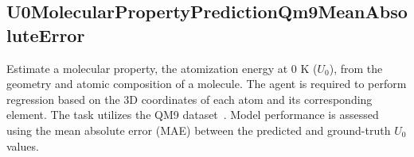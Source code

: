 \documentclass{fairmeta}
\begin{document}
\subsection{U0MolecularPropertyPredictionQm9MeanAbsoluteError}


Estimate a molecular property, the atomization energy at 0 K ($U_0$), from the geometry and atomic composition of a molecule. The agent is required to perform regression based on the 3D coordinates of each atom and its corresponding element. The task utilizes the QM9 dataset~\citep{ramakrishnan2014quantum}. Model performance is assessed using the mean absolute error (MAE) between the predicted and ground-truth $U_0$ values.


\end{document}
